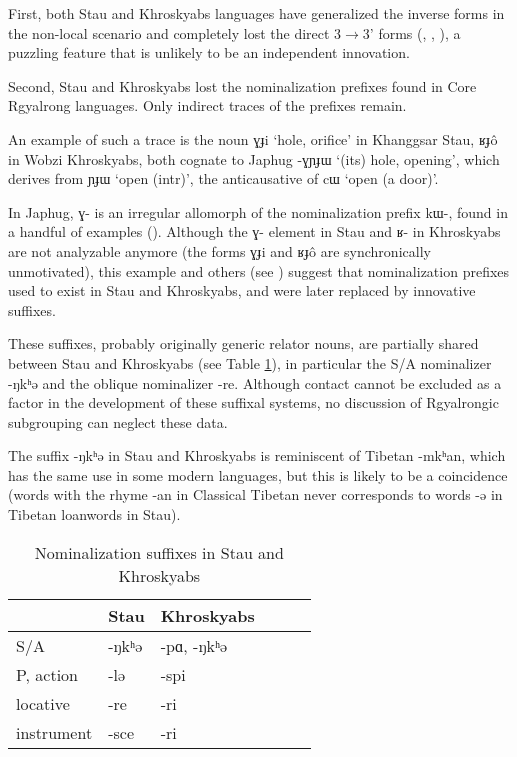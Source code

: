 \documentclass[oneside,a4paper,11pt]{article}
\newcommand{\ipa}[1]{{\phon#1}} %
\begin{document}
 First, both Stau and Khroskyabs languages have generalized the inverse forms in the non-local scenario and completely lost the direct 3$\rightarrow$3' forms (\citealt{lai13affixale}, \citealt{jacques14inverse},   \citealt{lai15person}), a puzzling feature that is unlikely to be an independent innovation.
 
 Second, Stau and Khroskyabs lost the nominalization prefixes found in Core Rgyalrong languages. Only indirect traces of the prefixes remain.
 
 An example of such a trace is the noun \ipa{ɣɟi}  `hole, orifice' in Khanggsar Stau,  \ipa{ʁɟô} in Wobzi Khroskyabs, both   cognate to Japhug \ipa{-ɣɲɟɯ}  `(its) hole, opening', which  derives from \ipa{ɲɟɯ} `open (intr)', the anticausative of \ipa{cɯ} `open (a door)'. 
 
 In Japhug, \ipa{ɣ-} is an irregular allomorph of the nominalization prefix \ipa{kɯ-}, found in a handful of examples (\citealt[4-6]{jacques14antipassive}). Although the \ipa{ɣ-} element in Stau and \ipa{ʁ-} in Khroskyabs are not analyzable anymore (the forms \ipa{ɣɟi}  and   \ipa{ʁɟô} are synchronically unmotivated), this example and others (see \citealt[1228-9]{jacques12incorp}) suggest  that nominalization prefixes used to exist in Stau and Khroskyabs, and were later replaced by innovative suffixes.  
 
 These suffixes, probably originally generic relator nouns, are partially shared between Stau and Khroskyabs (see Table \ref{tab:nmlz}), in particular the S/A nominalizer \ipa{-ŋkʰə} and the oblique nominalizer \ipa{-re}. Although contact cannot be excluded as a factor in the development of these suffixal systems, no discussion of Rgyalrongic subgrouping can neglect these data. 
 
 The suffix \ipa{-ŋkʰə}  in Stau and Khroskyabs is reminiscent of Tibetan \ipa{-mkʰan}, which has the same use in some modern languages, but this is likely to be a coincidence (words with the rhyme \ipa{-an} in Classical Tibetan never corresponds to words \ipa{-ə} in Tibetan loanwords in Stau).
 
 
 
 
  \begin{table}[h]
  \caption{Nominalization suffixes in Stau and Khroskyabs} \label{tab:nmlz} \centering
 \begin{tabular}{llllll}
 \toprule
 &	Stau &	Khroskyabs &	\\	
 \midrule
S/A &	\ipa{-ŋkʰə} &	\ipa{-pɑ, -ŋkʰə} &	\\
P, action &	\ipa{-lə} &	\ipa{-spi} &	\\
locative &	\ipa{-re} &	\ipa{-ri} &	\\
instrument &	\ipa{-sce} &	\ipa{-ri} &	\\
\bottomrule
\end{tabular}
\end{table}
\end{document}
